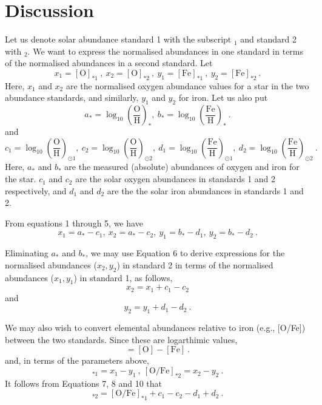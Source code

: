 \section{Discussion}
Let us denote solar abundance standard 1 with the subscript $_1$ and standard 2 with $_2$. We want to express the normalised abundances in one standard in terms of the normalised abundances in a second standard. Let
\begin{equation}
x_1 = [\text{O}]_{*1}\ ,\  x_2 = [\text{O}]_{*2}\ ,\  y_1 = [\text{Fe}]_{*1}\ ,\  y_2 = [\text{Fe}]_{*2}\ .
\end{equation}
Here, $x_1$ and $x_2$ are the normalised oxygen abundance values for a star in the two abundance standards, and similarly, $y_1$ and $y_2$ for iron.
Let us also put
\begin{equation}
a_* = \log_{10}\left(\frac{\text{O}}{\text{H}}\right)_* ,\  b_* =  \log_{10}\left(\frac{\text{Fe}}{\text{H}}\right)_*\ .
\end{equation}
and
\begin{equation}
c_1 = \log_{10}\left(\frac{\text{O}}{\text{H}}\right)_{\odot 1} ,\  c_2 =  \log_{10}\left(\frac{\text{O}}{\text{H}}\right)_{\odot 2} ,\  d_1 = \log_{10}\left(\frac{\text{Fe}}{\text{H}}\right)_{\odot 1} ,\  d_2 =  \log_{10}\left(\frac{\text{Fe}}{\text{H}}\right)_{\odot 2}\ .
\end{equation}
Here, $a_*$ and $b_*$ are the measured (absolute) abundances of oxygen and iron for the star. $c_1$ and $c_2$ are the solar oxygen abundances in standards 1 and 2 respectively, and $d_1$ and $d_2$ are the the solar iron abundances in standards 1 and 2.
  
From equations 1 through 5, we have
\begin{equation}
x_1 = a_* - c_1 ,\  x_2 = a_* - c_2 ,\ y_1 = b_* - d_1 ,\ y_2 = b_* - d_2 \ .
\end{equation}

Eliminating $a_*$ and $b_*$, we may use Equation 6 to derive expressions for the normalised abundances ($x_2, y_2$) in standard 2 in terms of the normalised abundances ($x_1, y_1$)  in standard 1, as follows,
\begin{equation}
x_2 = x_1 + c_1 - c_2 
\end{equation}
and
\begin{equation}
y_2 = y_1 + d_1 - d_2 \ .
\end{equation}

We may also wish to convert elemental abundances relative to iron (e.g., [O/Fe]) between the two standards. Since these are logarthimic values,
\begin{equation}
[\text{O}/\text{Fe}] = [\text{O}] - [\text{Fe}] \ .
\end{equation}
and, in terms of the parameters above,
\begin{equation}
[\text{O}/\text{Fe}]_{*1} = x_1 - y_1 \ ,\  [\text{O}/\text{Fe}]_{*2} = x_2 - y_2 \ .
\end{equation}
It follows from Equations 7, 8 and 10 that
\begin{equation}
[\text{O}/\text{Fe}]_{*2} = [\text{O}/\text{Fe}]_{*1} + c_1 - c_2 - d_1 +d_2 \ .
\end{equation}

